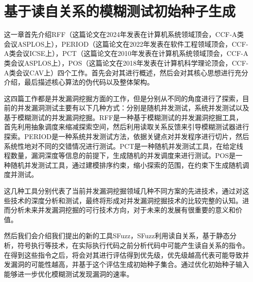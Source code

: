 \clearpage{}

\section{基于读自关系的模糊测试初始种子生成}
这一章首先介绍RFF\cite{wolff2024greybox}（这篇论文在2024年发表在计算机系统领域顶会，CCF-A类会议ASPLOS上），PERIOD\cite{wen2022controlled}（这篇论文在2022年发表在软件工程领域顶会，CCF-A类会议ICSE上），PCT\cite{burckhardt2010randomized}（这篇论文在2010年发表在计算机系统领域顶会，CCF-A类会议ASPLOS上），POS\cite{yuan2018partial}（这篇论文在2018年发表在计算机科学理论顶会，CCF-A类会议CAV上）四个工作。首先会对其进行概述，然后会对其核心思想进行充分介绍，最后描述核心算法的伪代码以及整体架构。

这四篇工作都是并发漏洞挖掘方面的工作，但是分别从不同的角度进行了探索，目前的并发漏洞测试主要有以下几种方式：分别是随机并发测试，系统并发测试以及基于模糊测试的并发漏洞挖掘。RFF是一种基于模糊测试的并发漏洞挖掘工具，首先利用抽象调度来缩减探索空间，然后利用读取关系反馈来引导模糊测试器进行探索。PERIOD是一种系统并发测试方法，依据关键点对并发程序进行切片，然后系统性地对不同的交错情况进行测试。PCT是一种随机并发测试工具，在给定线程数量，漏洞深度等信息的前提下，生成随机的并发调度来进行测试。POS是一种随机并发测试工具，通过建模排序约束，缩小探索的范围，在约束下生成随机调度并测试。

这几种工具分别代表了当前并发漏洞挖掘领域几种不同方案的先进技术，通过对这些技术的深度分析和测试，最终将形成对并发漏洞挖掘技术的比较完整的认知。进而分析未来并发漏洞挖掘的可行技术方向，对于未来的发展有很重要的意义和价值。

然后我们会介绍我们提出的新的工具SFuzz，SFuzz利用读自关系，基于静态分析，符号执行等技术，在实际执行代码之前分析代码中可能产生读自关系的指令。在得到这些指令之后，将会对其进行评估得到优先级，优先级越高代表可能导致并发漏洞的可能性越高，并基于这个评估生成初始种子集合。通过优化初始种子输入能够进一步优化模糊测试发现漏洞的速率。



